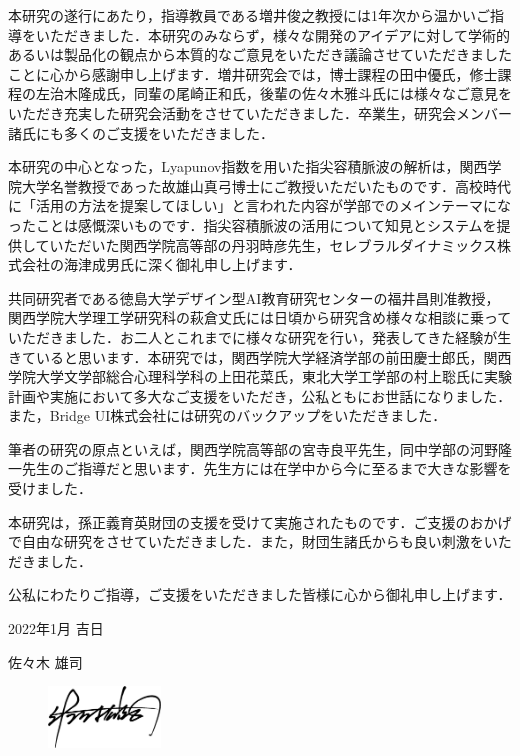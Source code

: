 \begin{acknowledgment}

本研究の遂行にあたり，指導教員である増井俊之教授には1年次から温かいご指導をいただきました．本研究のみならず，様々な開発のアイデアに対して学術的あるいは製品化の観点から本質的なご意見をいただき議論させていただきましたことに心から感謝申し上げます．増井研究会では，博士課程の田中優氏，修士課程の左治木隆成氏，同輩の尾崎正和氏，後輩の佐々木雅斗氏には様々なご意見をいただき充実した研究会活動をさせていただきました．卒業生，研究会メンバー諸氏にも多くのご支援をいただきました．

本研究の中心となった，Lyapunov指数を用いた指尖容積脈波の解析は，関西学院大学名誉教授であった故雄山真弓博士にご教授いただいたものです．高校時代に「活用の方法を提案してほしい」と言われた内容が学部でのメインテーマになったことは感慨深いものです．指尖容積脈波の活用について知見とシステムを提供していただいた関西学院高等部の丹羽時彦先生，セレブラルダイナミックス株式会社の海津成男氏に深く御礼申し上げます．

共同研究者である徳島大学デザイン型AI教育研究センターの福井昌則准教授，関西学院大学理工学研究科の萩倉丈氏には日頃から研究含め様々な相談に乗っていただきました．お二人とこれまでに様々な研究を行い，発表してきた経験が生きていると思います．本研究では，関西学院大学経済学部の前田慶士郎氏，関西学院大学文学部総合心理科学科の上田花菜氏，東北大学工学部の村上聡氏に実験計画や実施において多大なご支援をいただき，公私ともにお世話になりました．また，Bridge UI株式会社には研究のバックアップをいただきました．

筆者の研究の原点といえば，関西学院高等部の宮寺良平先生，同中学部の河野隆一先生のご指導だと思います．先生方には在学中から今に至るまで大きな影響を受けました．

本研究は，孫正義育英財団の支援を受けて実施されたものです．ご支援のおかげで自由な研究をさせていただきました．また，財団生諸氏からも良い刺激をいただきました．

公私にわたりご指導，ご支援をいただきました皆様に心から御礼申し上げます．

\begin{flushright}
2022年1月 吉日

佐々木 雄司
\end{flushright}

\begin{figure}[htbp]
    \begin{flushright}
       \includegraphics[width=30mm]{img/signature.jpeg}
    \end{flushright}
\end{figure}

\end{acknowledgment}
